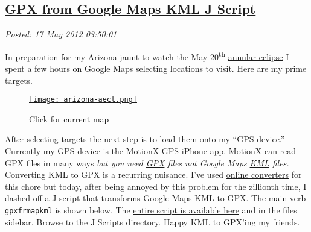 %

\subsection*{\href{https://bakerjd99.wordpress.com/2012/05/16/gpx-from-google-maps-kml-j-script/}{GPX from Google Maps KML J Script}}


\noindent\emph{Posted: 17 May 2012 03:50:01}
\vspace{6pt}

In preparation for my Arizona jaunt to watch the May
20\textsuperscript{th}
\href{http://eclipse-maps.com/Eclipse-Maps/Gallery/Pages/Annular\_solar\_eclipse\_of\_2012\_May\_20.html}{annular
eclipse} I spent a few hours on Google Maps selecting locations to
visit. Here are my prime targets.

\captionsetup[figure]{labelformat=empty}
\begin{figure}[htbp]
\centering
\href{http://maps.google.com/maps/ms?msid=213851645709730088342.0004bd67c9be9e39b4797&msa=0}{\texttt{[image: arizona-aect.png]}}
\caption{Click for current map}
\label{fig:119X0}
\end{figure}


After selecting targets the next step is to load them onto my ``GPS
device.'' Currently my GPS device is the
\href{http://gps.motionx.com/iphone/overview/}{MotionX GPS iPhone} app.
MotionX can read GPX files in many ways \emph{but you need
\href{http://www.topografix.com/gpx.asp}{GPX} files not Google Maps
\href{https://developers.google.com/kml/documentation/}{KML} files.}
Converting KML to GPX is a recurring nuisance. I've used
\href{http://kml2gpx.com/}{online converters} for this chore but today,
after being annoyed by this problem for the zillionth time, I dashed off
a \href{http://www.jsoftware.com/jwiki/FrontPage}{J script} that
transforms Google Maps KML to GPX. The main verb \texttt{gpxfrmapkml} is
shown below. The
\href{https://www.box.com/s/09dc770e4821500d222b}{entire script is
available here} and in the files sidebar. Browse to the J Scripts
directory. Happy KML to GPX'ing my friends.

